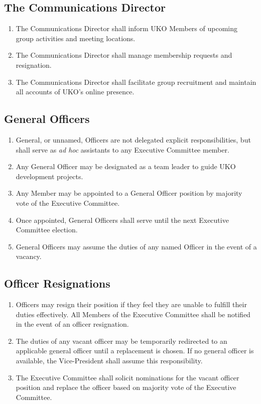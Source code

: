 \documentclass[12pt,executivepaper]{article}
\begin{document}
\subsection{The Communications Director}
\begin{enumerate}
    \item The Communications Director shall inform UKO Members of upcoming
          group activities and meeting locations.
    \item The Communications Director shall manage membership requests and
          resignation.
    \item The Communications Director shall facilitate group recruitment and
          maintain all accounts of UKO's online presence.
\end{enumerate}

\subsection{General Officers}
\begin{enumerate}
    \item General, or unnamed, Officers are not delegated explicit
          responsibilities, but shall serve as \textit{ad hoc} assistants to
          any Executive Committee member.
    \item Any General Officer may be designated as a team leader to guide UKO
          development projects.
    \item Any Member may be appointed to a General Officer position by majority
          vote of the Executive Committee.
    \item Once appointed, General Officers shall serve until the next Executive
          Committee election.
    \item General Officers may assume the duties of any named Officer in the
          event of a vacancy.
\end{enumerate}

\subsection{Officer Resignations}
\begin{enumerate}
    \item Officers may resign their position if they feel they are unable to
          fulfill their duties effectively. All Members of the Executive
          Committee shall be notified in the event of an officer resignation.
    \item The duties of any vacant officer may be temporarily redirected to
          an applicable general officer until a replacement is chosen. If
          no general officer is available, the Vice-President shall
          assume this responsibility.
    \item The Executive Committee shall solicit nominations for the vacant
          officer position and replace the officer based on majority vote of
          the Executive Committee.
\end{enumerate}
\end{document}
